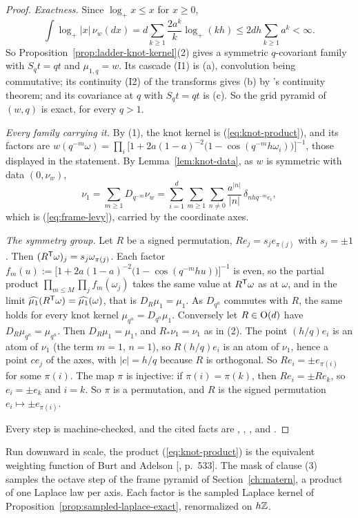 \begin{proof}
\emph{Exactness.} Since $\log_+ x \le x$ for $x \ge 0$,
\[
\int\log_+|x|\,\nu_w(dx) = d\sum_{k \ge 1}\frac{2a^k}{k}\log_+(kh)
\le 2dh\sum_{k \ge 1}a^k < \infty .
\]
So Proposition~\ref{prop:ladder-knot-kernel}(2) gives a symmetric $q$-covariant family with
$S_qt = qt$ and $\mu_{1,q} = w$. Its cascade (I1) is (a), convolution being commutative; its
continuity (I2) of the transforms gives (b) by \Levy's continuity theorem; and its covariance at
$q$ with $S_qt = qt$ is (c). So the grid pyramid of $(w, q)$ is exact, for every $q > 1$.

\emph{Every family carrying it.} By (1), the knot kernel is (\ref{eq:knot-product}), and its
factors are
$\widehat{w}(q^{-m}\omega) = \prod_i\bigl[1 + 2a(1-a)^{-2}\bigl(1 - \cos(q^{-m}h\omega_i)\bigr)
\bigr]^{-1}$, those displayed in the statement. By Lemma~\ref{lem:knot-data}, as $w$ is symmetric
with data $(0, \nu_w)$,
\[
\nu_1 = \sum_{m \ge 1}D_{q^{-m}}\nu_w
= \sum_{i=1}^d\sum_{m \ge 1}\sum_{n \ne 0}\frac{a^{|n|}}{|n|}\,\delta_{nhq^{-m}e_i},
\]
which is (\ref{eq:frame-levy}), carried by the coordinate axes.

\emph{The symmetry group.} Let $R$ be a signed permutation, $Re_j = s_je_{\pi(j)}$ with
$s_j = \pm1$. Then $(R^{\mathsf{T}}\omega)_j = s_j\omega_{\pi(j)}$. Each factor
$f_m(u) := \bigl[1 + 2a(1-a)^{-2}\bigl(1 - \cos(q^{-m}hu)\bigr)\bigr]^{-1}$ is even, so the
partial product $\prod_{m \le M}\prod_jf_m(\omega_j)$ takes the same value at $R^{\mathsf{T}}\omega$ as at
$\omega$, and in the limit $\widehat{\mu_1}(R^{\mathsf{T}}\omega) = \widehat{\mu_1}(\omega)$, that is
$D_R\mu_1 = \mu_1$. As $D_{q^n}$ commutes with $R$, the same holds for every knot kernel
$\mu_{q^n} = D_{q^n}\mu_1$. Conversely let $R \in \mathrm{O}(d)$ have $D_R\mu_{q^n} = \mu_{q^n}$. Then
$D_R\mu_1 = \mu_1$, and $R_*\nu_1 = \nu_1$ as in (2). The point $(h/q)e_i$ is an atom of $\nu_1$
(the term $m = 1$, $n = 1$), so $R(h/q)e_i$ is an atom of $\nu_1$, hence a point $ce_j$ of the
axes, with $|c| = h/q$ because $R$ is orthogonal. So $Re_i = \pm e_{\pi(i)}$ for some
$\pi(i)$. The map $\pi$ is injective: if $\pi(i) = \pi(k)$, then $Re_i = \pm Re_k$, so
$e_i = \pm e_k$ and $i = k$. So $\pi$ is a permutation, and $R$ is the signed permutation
$e_i \mapsto \pm e_{\pi(i)}$.

Every step is machine-checked, and the cited facts are , , ,
 and .
\end{proof}

Run downward in scale, the product (\ref{eq:knot-product}) is the equivalent weighting function of
Burt and Adelson [, p.~533]. The mask of clause (3) samples the octave
step of the frame \Matern{} pyramid of Section~\ref{ch:matern}, a product of one Laplace law per
axis. Each factor is the sampled Laplace kernel of Proposition~\ref{prop:sampled-laplace-exact},
renormalized on $h\mathbb{Z}$.

